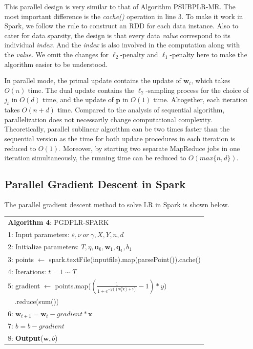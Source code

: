 \documentclass[10pt, conference, compsocconf]{IEEEtran}
\newcommand{\bw}{\mathbf{w}}
\newcommand{\bp}{\mathbf{p}}
\newcommand{\bq}{\mathbf{q}}
\newcommand{\tspace}{\hspace*{2em}}
\begin{document}
This parallel design is very similar to that of Algorithm PSUBPLR-MR.
The most important difference is the \textit{cache()} operation in line 3.
To make it work in Spark, we follow the rule to construct an RDD for each data instance.
Also to cater for data sparsity, the design is that every data \textit{value} correspond to its individual \textit{index}. And the \textit{index} is also involved in the computation along with the \textit{value}.
We omit the changes for $\ell_2$-penalty and $\ell_1$-penalty here to make the algorithm easier to be understood.

In parallel mode, the primal update contains the update of $\bw_t$, which takes $O(n)$ time.
The dual update contains the $\ell_2$-sampling process for the choice of $j_t$ in $O(d)$ time, and the update of $\bp$ in $O(1)$ time.
Altogether, each iteration takes $O(n+d)$ time.
Compared to the analysis of sequential algorithm, parallelization does not necessarily change computational complexity.
Theoretically, parallel sublinear algorithm can be two times faster than the sequential version as the time for both update procedures in each iteration is reduced to $O(1)$.
Moreover, by starting two separate MapReduce jobs in one iteration simultaneously, the running time can be reduced to $O(max\{n,d\})$.

\subsection{Parallel Gradient Descent in Spark}
The parallel gradient descent method to solve LR in Spark is shown below.
    \begin{table}[ht]
	\begin{tabular}{l}
    \hline\noalign{\smallskip}
	\textbf{Algorithm 4}: PGDPLR-SPARK \\
	\noalign{\smallskip}
	\hline
	\noalign{\smallskip}
    1:  Input parameters: $\varepsilon, \nu~or~\gamma, X, Y, n, d$ \\
    2:	Initialize parameters: $T, \eta, {\mathbf{u}}_{0}, {\bw}_{1}, {\mathbf{\bq}}_{1}, {b}_{1}$\\
    3:  points $\leftarrow$ spark.textFile(inputfile).map(parsePoint()).cache() \\
    4:  Iterations: $t=1 \sim T$ \\
    5:  \tspace gradient $\leftarrow$ points.map($(\frac{1}{1+e^{-y((\bw_t^T \textbf{x})+b)}}-1)*y$) \\
        ~~\tspace\tspace\tspace\tspace\tspace .reduce(sum()) \\
    6:  \tspace $\bw_{t+1} = \bw_t - gradient * \textbf{x}$ \\
    7:  \tspace $b = b - gradient$ \\
    8:  \textbf{Output}($\bw, b$) \\
    \hline
    \end{tabular}
	\end{table}
\end{document}
